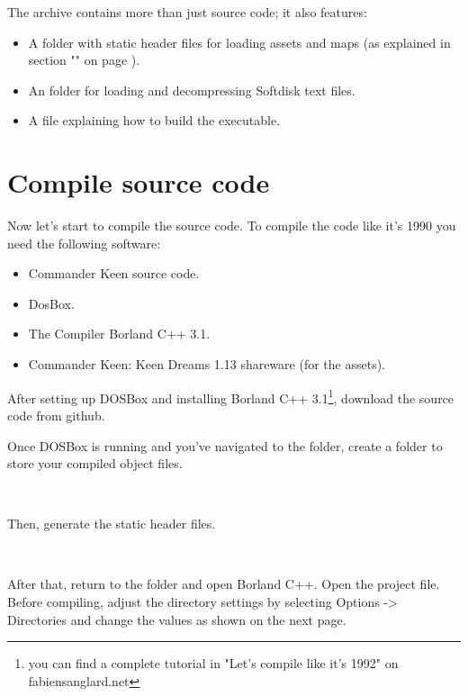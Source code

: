 \documentclass[book.tex]{subfiles}
\begin{document}
 
The archive contains more than just source code; it also features:
\begin{itemize}
\item A  folder with static header files for loading assets and maps (as explained in section "" on page \pageref{section:graphic_assets}).
\item An  folder for loading and decompressing Softdisk text files.
\item A  file explaining how to build the executable.
\end{itemize}

\pagebreak
\section{Compile source code}
Now let's start to compile the source code. To compile the code like it's 1990 you need the following software:
\begin{itemize}
\item Commander Keen source code.
\item DosBox.
\item The Compiler Borland C++ 3.1.
\item Commander Keen: Keen Dreams 1.13 shareware (for the assets).
\end{itemize}

\par
After setting up DOSBox and installing Borland C++ 3.1\footnote{you can find a complete tutorial in "Let's compile like it's 1992" on fabiensanglard.net}, download the source code from github.\\

\par
Once DOSBox is running and you've navigated to the  folder, create a folder to store your compiled object files. \\

\par
{}\\
\par
Then, generate the static  header files.\\
\par
{}\\
\par
After that, return to the  folder and open Borland C++. Open the  project file. Before compiling, adjust the directory settings by selecting Options -> Directories and change the values as shown on the next page. \\
\end{document}
